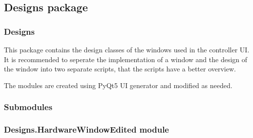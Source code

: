 \documentclass[letterpaper,10pt,english]{sphinxmanual}
\begin{document}
\sphinxstepscope


\subsection{Designs package}
\label{\detokenize{NoSeMazeControl/Designs:designs-package}}\label{\detokenize{NoSeMazeControl/Designs::doc}}

\subsubsection{Designs}
\label{\detokenize{NoSeMazeControl/Designs:designs}}
\sphinxAtStartPar
This package contains the design classes of the windows used in the controller UI. It is recommended to seperate the implementation of a window and the design of the window into two separate scripts, that the scripts have a better overview.

\sphinxAtStartPar
The modules are created using PyQt5 UI generator and modified as needed.


\subsubsection{Submodules}
\label{\detokenize{NoSeMazeControl/Designs:submodules}}

\subsubsection{Designs.HardwareWindowEdited module}
\label{\detokenize{NoSeMazeControl/Designs:module-Designs.HardwareWindowEdited}}\label{\detokenize{NoSeMazeControl/Designs:designs-hardwarewindowedited-module}}
\end{document}
